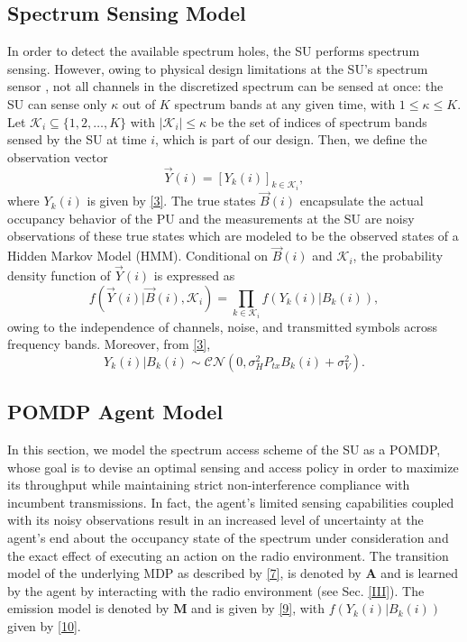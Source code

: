 \documentclass[10pt,twocolumn]{IEEEtran}
\begin{document}
\subsection{Spectrum Sensing Model}
In order to detect the available spectrum holes, the SU performs spectrum sensing. However, owing to physical design limitations at the SU's spectrum sensor \cite{5990482}, not all channels in the discretized spectrum can be sensed at once: the SU can sense only $\kappa$ out of $K$ spectrum bands at any given time, with $1\leq \kappa\leq K$. Let $\mathcal K_{i}\subseteq\{1,2,\dots,K\}$ with $|\mathcal K_i|\leq \kappa$ be the set of indices of spectrum bands sensed by the SU at time $i$, which is part of our design.
Then, we define the observation vector
\begin{equation}\label{8}
    \vec{Y}(i) = [Y_k(i)]_{k \in \mathcal K_i},
\end{equation}
where $Y_k(i)$ is given by \eqref{3}.
The true states $\vec{B}(i)$ encapsulate the actual occupancy behavior of the PU and the measurements at the SU are noisy observations of these true states which are modeled to be the observed states of a Hidden Markov Model (HMM). 
Conditional on $\vec{B}(i)$ and $\mathcal K_i$, the probability density function of $\vec{Y}(i)$ is expressed as
\begin{equation}\label{9}
    f(\vec{Y}(i)|\vec{B}(i), \mathcal K_i) = \prod_{k \in \mathcal K_i} f(Y_k(i)|B_k(i)),
\end{equation}
owing to the independence of channels, noise, and transmitted symbols across frequency bands. Moreover, from \eqref{3},
\begin{equation}\label{10}
 Y_k(i)|B_k(i) \sim \mathcal{CN}(0, \sigma_H^2P_{tx}B_k(i) + \sigma_V^2).
\end{equation}
\subsection{POMDP Agent Model}
In this section, we model the spectrum access scheme of the SU as a POMDP, whose goal is to devise an optimal sensing and access policy in order to maximize its throughput while maintaining strict non-interference compliance with incumbent transmissions. In fact, the agent's limited sensing capabilities coupled with its noisy observations result in an increased level of uncertainty at the agent's end about the occupancy state of the spectrum under consideration and the exact effect of executing an action on the radio environment. The transition model of the underlying MDP as described by \eqref{7}, is denoted by $\mathbf{A}$ and is learned by the agent by interacting with the radio environment (see Sec. \ref{III}). The emission model is denoted by $\mathbf{M}$ and is given by \eqref{9}, with $f(Y_k(i)|B_k(i))$ given by \eqref{10}. 
\end{document}
